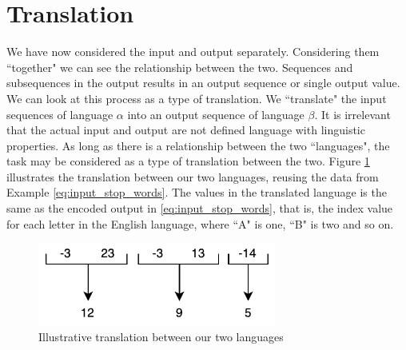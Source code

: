 
\section{Translation}
We have now considered the input and output separately. Considering them ``together" we can see the relationship between the two. Sequences and subsequences in the output results in an output sequence or single output value. We can look at this process as a type of translation. We ``translate" the input sequences of language \(\alpha\) into an output sequence of language \(\beta\). It is irrelevant that the actual input and output are not defined language with linguistic properties. As long as there is a relationship between the two ``languages", the task may be considered as a type of translation between the two. Figure \ref{fig:number_translation} illustrates the translation between our two languages, reusing the data from Example \ref{eq:input_stop_words}. The values in the translated language is the same as the encoded output in \ref{eq:input_stop_words}, that is, the index value for each letter in the English language, where ``A" is one, ``B" is two and so on.

\begin{figure}[h]
    \centering
    \includegraphics[width=0.7\textwidth]{fig/background_theory/number_translation.pdf}
    \caption{Illustrative translation between our two languages}
    \label{fig:number_translation}
\end{figure}

